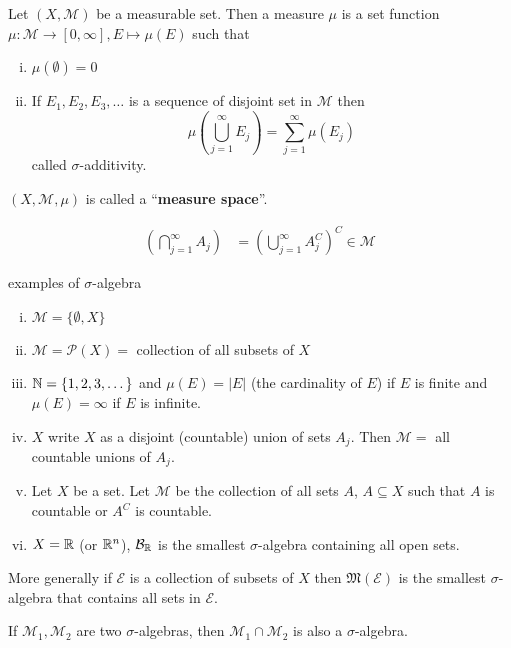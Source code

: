 \begin{definition}
Let $(X, \mathcal{M})$ be a measurable set. Then a measure $\mu$ is a set function 
$\mu: \mathcal{M} \to [0, \infty], E \mapsto \mu(E)$ such that
\begin{enumerate}[(i)]
  \item $\mu(\emptyset) = 0$
  \item If $E_1, E_2, E_3, \dotsc$ is a sequence of disjoint set in $\mathcal{M}$ then
  \[\mu\left(\bigcup_{j=1}^\infty E_j\right) = \sum_{j = 1}^\infty \mu(E_j)\]
  called $\sigma$-additivity.
\end{enumerate}
$(X, \mathcal{M}, \mu)$ is called a ``\textbf{measure space}''.
\end{definition}

\begin{remark}
  \begin{align*}
    \left(\bigcap_{j=1}^\infty A_j\right) &= \left(\bigcup_{j=1}^\infty A_j^C\right)^C \in \mathcal{M}
  \end{align*} 
\end{remark}
\begin{example}
  examples of $\sigma$-algebra
  \begin{enumerate}[(i)]
    \item $\mathcal{M} = \{\emptyset, X\}$ 
    \item $\mathcal{M} = \mathcal{P}(X) = $ collection of all subsets of $X$
    \item[] $\mathbb N = \{1, 2, 3, \dotsc\}$ and $\mu(E) = |E|$ (the cardinality of $E$) if $E$ is finite and 
    $\mu(E) = \infty$ if $E$ is infinite.
    \item $X$ write $X$ as a disjoint (countable) union of sets $A_j$. Then
    $\mathcal{M} = $ all countable unions of $A_j$. 
    \item Let $X$ be a set. Let $\mathcal{M}$ be the collection of all sets $A$, $A \subseteq X$ such that
    $A$ is countable or $A^C$ is countable.
    \item $X = \mathbb R$ (or $\mathbb R^n$), $\mathcal{B}_\mathbb R$ is the smallest $\sigma$-algebra containing all open sets.
  \end{enumerate}
\end{example}

More generally if $\mathcal{E}$ is a collection of subsets of $X$ then $\mathfrak{M}(\mathcal{E})$ is the smallest
$\sigma$-algebra that contains all sets in $\mathcal{E}$.

If $\mathcal{M}_1, \mathcal{M}_2$ are two $\sigma$-algebras, then $\mathcal{M}_1 \cap \mathcal{M}_2$ is also a 
$\sigma$-algebra.

